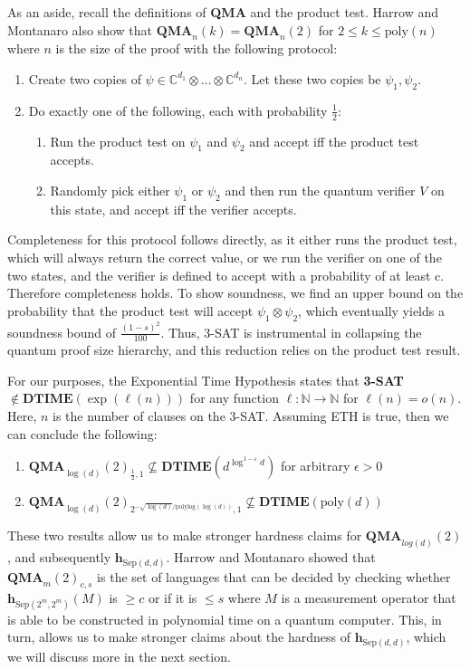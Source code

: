 \documentclass[10pt]{article}
\newcommand{\Sep}{\textrm{Sep}}
\newcommand{\C}{\mathbb{C}}
\newcommand{\N}{\mathbb{N}}
\newcommand{\mbf}[1]{\mathbf{ #1 }}
\begin{document}
As an aside, recall the definitions of \textbf{QMA} and the product test. Harrow and Montanaro also show that $\textbf{QMA}_n(k) = \textbf{QMA}_n(2)$ for $2 \le k \le \textrm{poly}(n)$ where $n$ is the size of the proof with the following protocol:
\begin{enumerate}
    \item Create two copies of $\psi \in \C^{d_1} \otimes \dots \otimes \C^{d_n}.$ Let these two copies be $\psi_1,\psi_2$.
    \item Do exactly one of the following, each with probability $\frac{1}{2}$:
    \begin{enumerate}
        \item Run the product test on $\psi_1$ and $\psi_2$ and accept iff the product test accepts.
        \item Randomly pick either $\psi_1$ or $\psi_2$ and then run the quantum verifier $V$ on this state, and accept iff the verifier accepts.
    \end{enumerate}
\end{enumerate}
Completeness for this protocol follows directly, as it either runs the product test, which will always return the correct value, or we run the verifier on one of the two states, and the verifier is defined to accept with a probability of at least c. Therefore completeness holds. To show soundness, we find an upper bound on the probability that the product test will accept $\psi_1 \otimes \psi_2$, which eventually yields a soundness bound of $\frac{(1-s)^2}{100}$. Thus, 3-SAT is instrumental in collapsing the quantum proof size hierarchy, and this reduction relies on the product test result.

For our purposes, the Exponential Time Hypothesis states that \textbf{3-SAT} $\notin \textbf{DTIME}(\exp(\ell(n)))$ for any function $\ell : \N \rightarrow \N$ for $\ell(n) = o(n)$. Here, $n$ is the number of clauses on the 3-SAT. Assuming ETH is true, then we can  conclude the following:
\begin{enumerate}
    \item $\textbf{QMA}_{\log(d)}(2)_{\frac{1}{2}, 1} \nsubseteq \textbf{DTIME}(d^{\log^{1-\varepsilon}d})$ for arbitrary $\epsilon > 0$
    \item $\textbf{QMA}_{\log(d)}(2)_{2^{-\sqrt{\log(d)}/\textrm{polylog}(\log(d))}, 1} \nsubseteq \textbf{DTIME}(\textrm{poly}(d))$
\end{enumerate}
These two results allow us to make stronger hardness claims for $\textbf{QMA}_{log(d)}(2)$, and subsequently $\mbf{h}_{\Sep(d,d)}$. Harrow and Montanaro showed that $\textbf{QMA}_{m}(2)_{c, s}$ is the set of languages that can be decided by checking whether $\mbf{h}_{\Sep(2^m,2^m)}(M)$ is $\ge  c$ or if it is $\le s$ where $M$ is a measurement operator that is able to be constructed in polynomial time on a quantum computer. This, in turn, allows us to make stronger claims about the hardness of $\mbf{h}_{\Sep(d,d)}$, which we will discuss more in the next section. 
 
\end{document}
